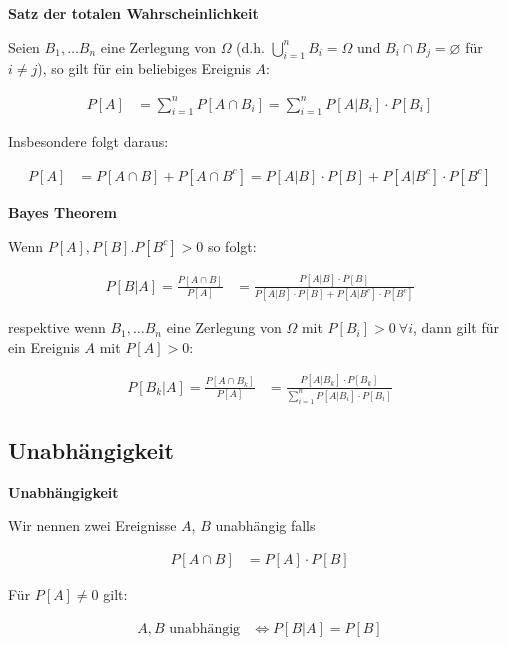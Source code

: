 \documentclass[25pt]{sciposter}
\newenvironment{method}[1]{\begin{mdframed}[backgroundcolor=blue!10,innertopmargin=15pt, innerbottommargin=15pt,nobreak=true]
		\textbf{#1 }
	}
	{ 
	\end{mdframed}
}
\newenvironment{thm}[1]{\begin{mdframed}[backgroundcolor=pink!50,innertopmargin=15pt, innerbottommargin=15pt, nobreak=true]
		\textbf{#1 }
	}
	{ 
	\end{mdframed}
}
\begin{document}
\begin{multicols}{3}
\begin{thm}{Satz der totalen Wahrscheinlichkeit}
	 Seien $B_1, \ldots B_n$ eine Zerlegung von $\Omega$ (d.h. $\bigcup_{i=1}^n B_i = \Omega$ und $B_i \cap B_j = \varnothing$ für $i\neq j$), so gilt für ein beliebiges Ereignis $A$:
	 
	 \begin{align*}
	 	P[A] &= \sum_{i=1}^{n} P[A\cap B_i] = \sum_{i=1}^{n} P[A|B_i]\cdot P[B_i]
	 \end{align*}
	 
	 Insbesondere folgt daraus:
	 
	 \begin{align*}
	 	P[A] &= P[A\cap B] + P[A \cap B^c] = P[A|B]\cdot P[B] + P[A|B^c]\cdot P[B^c]
	 \end{align*}
\end{thm}


\begin{thm}{Bayes Theorem}
	Wenn $P[A],P[B].P[B^c]> 0$ so folgt:
	
	\begin{align*}
		P[B|A] = \frac{P[A\cap B]}{P[A]} &= \frac{P[A|B]\cdot P[B]}{P[A|B]\cdot P[B] + P[A|B^c]\cdot P[B^c]}
	\end{align*}
	
	respektive wenn $B_1, \ldots B_n$ eine Zerlegung von $\Omega$ mit $P[B_i]>0 \  \forall i$, dann gilt für ein Ereignis $A$ mit $P[A]>0$:
	
	\begin{align*}
		P[B_k|A] = \frac{P[A\cap B_k]}{P[A]} &= \frac{P[A|B_k]\cdot P[B_k]}{\sum_{i=1}^{n} P[A|B_i] \cdot P[B_i] }
	\end{align*}
\end{thm}


\subsection*{Unabhängigkeit}

\begin{method}{Unabhängigkeit}
	Wir nennen zwei Ereignisse $A$, $B$ unabhängig falls
	
	\begin{align*}
		P[A\cap B] &= P[A] \cdot P[B]
	\end{align*}
	
	Für $P[A] \neq 0$ gilt:
	
	\begin{align*}
		\text{$A,B$ unabhängig} &\iff P[B|A] = P[B]
	\end{align*}
	

\end{method}
\end{multicols}
\end{document}
